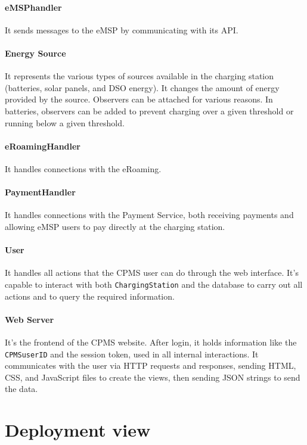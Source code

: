 \paragraph {eMSPhandler} It sends messages to the eMSP by communicating with its API.

\paragraph {Energy Source} It represents the various types of sources available in the charging station (batteries, solar panels, and DSO energy). It changes the amount of energy provided by the source. Observers can be attached for various reasons. In batteries, observers can be added to prevent charging over a given threshold or running below a given threshold. 

\paragraph {eRoamingHandler} It handles connections with the eRoaming.

\paragraph {PaymentHandler} It handles connections with the Payment Service, both receiving payments and allowing eMSP users to pay directly at the charging station.

\paragraph {User} It handles all actions that the CPMS user can do through the web interface. It's capable to interact with both \texttt{ChargingStation} and the database to carry out all actions and to query the required information. 

\paragraph {Web Server} It's the frontend of the CPMS website. After login, it holds information like the \texttt{CPMSuserID} and the session token, used in all internal interactions. It communicates with the user via HTTP requests and responses, sending HTML, CSS, and JavaScript files to create the views, then sending JSON strings to send the data.

\pagebreak

\section{Deployment view}

